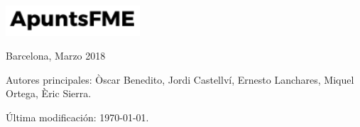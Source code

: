 \begin{titlepage}

    \vspace{2\baselineskip} %


    \vfill %


    \includegraphics[width=5cm]{../logo.pdf}

    \vspace{0.3\baselineskip} %
     
    Barcelona, Marzo 2018



\end{titlepage}

\vspace*{\fill}

\noindent Autores principales: Òscar Benedito, Jordi Castellví, Ernesto Lanchares, Miquel Ortega, Èric Sierra.

\quad

\noindent Última modificación: \today.

\doclicenseThis
